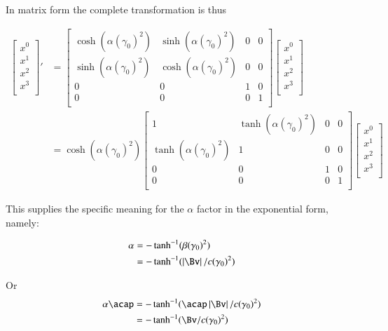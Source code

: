 In matrix form the complete transformation is thus

\begin{align*}
{\begin{bmatrix}
x^0 \\
x^1 \\
x^2 \\
x^3 \\
\end{bmatrix}}'
&=
\begin{bmatrix}
\cosh(\alpha(\gamma_0)^2) & \sinh(\alpha(\gamma_0)^2) & 0 & 0 \\
\sinh(\alpha(\gamma_0)^2) & \cosh(\alpha(\gamma_0)^2) & 0 & 0 \\
0 & 0 & 1 & 0 \\
0 & 0 & 0 & 1 \\
\end{bmatrix}
\begin{bmatrix}
x^0 \\
x^1 \\
x^2 \\
x^3 \\
\end{bmatrix} \\
&=
\cosh(\alpha(\gamma_0)^2) 
\begin{bmatrix}
1                         & \tanh(\alpha(\gamma_0)^2) & 0 & 0 \\
\tanh(\alpha(\gamma_0)^2) & 1                         & 0 & 0 \\
0 & 0 & 1 & 0 \\
0 & 0 & 0 & 1 \\
\end{bmatrix}
\begin{bmatrix}
x^0 \\
x^1 \\
x^2 \\
x^3 \\
\end{bmatrix}
\end{align*}

This supplies the specific meaning for the $\alpha$ factor in the exponential form, namely:

\begin{align*}
\alpha
&= -\tanh^{-1}(\beta (\gamma_0)^2) \\
&= -\tanh^{-1}(\Abs{\Bv}/c (\gamma_0)^2)
\end{align*}

Or
\begin{align*}
\alpha \acap
&= -\tanh^{-1}(\acap \Abs{\Bv}/c (\gamma_0)^2) \\
&= -\tanh^{-1}(\Bv/c (\gamma_0)^2) \\
\end{align*}

